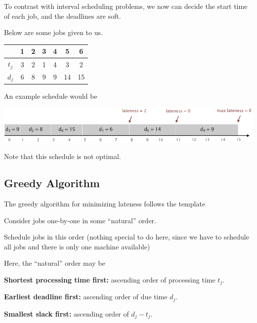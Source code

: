 To contrast with interval scheduling problems, we now can decide the start time of each job, and the deadlines are soft.

\begin{example}
    Below are some jobs given to us.

    \begin{table}[ht!]
        \centering
        \begin{tabular}{c|c|c|c|c|c|c}
                  & 1 & 2 & 3 & 4 & 5  & 6  \\ \hline
            $t_j$ & 3 & 2 & 1 & 4 & 3  & 2  \\ \hline
            $d_j$ & 6 & 8 & 9 & 9 & 14 & 15 \\
        \end{tabular}
    \end{table}

    An example schedule would be
    \begin{center}
        \includegraphics[width=0.8\linewidth]{figures/minimizing-lateness-example.png}
    \end{center}

    Note that this schedule is not optimal.
\end{example}

\subsection{Greedy Algorithm}

The greedy algorithm for minimizing lateness follows the template
\begin{listu}
    \item Consider jobs one-by-one in some ``natural'' order.
    \item Schedule jobs in this order (nothing special to do here, since we have to schedule all jobs and there is only one machine available)
\end{listu}

Here, the ``natural'' order may be
\begin{listu}
    \item \textbf{Shortest processing time first:} ascending order of processing time $t_j$.
    \item \textbf{Earliest deadline first:} ascending order of due time $d_j$.
    \item \textbf{Smallest slack first:} ascending order of $d_j - t_j$.
\end{listu}

